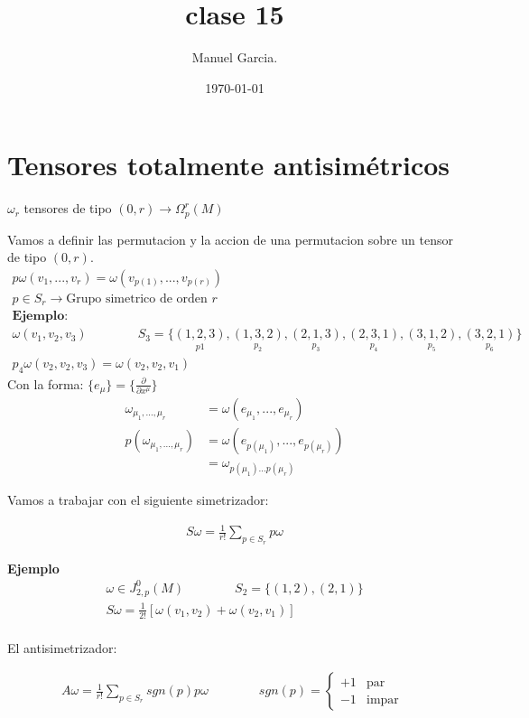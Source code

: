 \documentclass{article}
\title{clase 15 }
\author{Manuel Garcia.}
\date{\today}
\newcommand{\caja}[3]{%
  \begin{tcolorbox}[colback=#1!5!white,colframe=#1!25!black,title=#2]
    #3
  \end{tcolorbox}%
}
\begin{document}
\maketitle

\section{Tensores totalmente antisimétricos}
$ \omega_r  $ tensores de tipo $ (0,r) \rightarrow \Omega _p^r(M) $

Vamos a definir las permutacion y la accion de una permutacion sobre un tensor de tipo $ (0,r) $.
\begin{gather*}
  p\omega (v_1,...,v_r) = \omega(v _{p(1)} , ..., v _{p(r)} )\\
  p \in S_r \rightarrow \text{Grupo simetrico de orden }r \\
  \textbf{Ejemplo: }\\
  \omega(v_1,v_2,v_3) \qquad \qquad S_3 = \{ \underset{p1}{(1,2,3)}, \underset{p_2 }{(1,3,2)}, \underset{p_3}{(2,1,3 )}, \underset{p_4 }{(2,3,1 )}, \underset{p_5 }{(3,1,2)}, \underset{p_6 }{(3,2,1 )} \} \\
  p_4\omega(v_2,v_2,v_3) = \omega (v_2,v_2,v_1 )
\end{gather*}
Con la forma: $ \{e_\mu \} = \{\frac{\partial  }{\partial x ^ {\mu }} \}$
\begin{align*}
  \omega _{\mu_1,...,\mu_r } &= \omega(e_{\mu_1},...,e _{\mu_r } )\\
  p(\omega_{\mu_1,..., \mu_r }) &= \omega(e _{p(\mu_1)} , ..., e _{p(\mu_r )} )\\
  &= \omega _{p(\mu_1) \dots p(\mu_r)}
\end{align*}

Vamos a trabajar con el siguiente simetrizador: 
\caja{red}{Simetrizador}{
  \begin{gather*}
    S\omega = \frac{1}{r!} \displaystyle\sum_{p\in S_r }^{} p\omega 
  \end{gather*}
}
\textbf{Ejemplo }
\begin{gather*}
  \omega \in J ^ {0 } _{2, p } (M) \qquad \qquad S_2 = \{(1,2),(2,1)\}\\
  S\omega = \frac{1}{2! } [\omega(v_1,v_2) + \omega(v_2,v_1)]\\
\end{gather*}

El antisimetrizador: 
\caja{red}{Antisimetrizado}{
  \begin{gather*}
    A\omega = \frac{1}{r! } \displaystyle\sum_{p\in S_r }^{} sgn(p) p\omega \qquad \qquad sgn(p) = \begin{cases}
        +1 & \text{par }\\
        -1 & \text{impar }
    \end{cases}
  \end{gather*}
}
\end{document}
